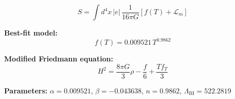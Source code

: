 
\begin{equation}
  S = \int d^4x \, |e| \, \frac{1}{16\pi G} \left[ f(T) + \mathcal{L}_m \right]
\end{equation}

\textbf{Best-fit model:}
\begin{equation}
  f(T) = 0.009521 \, T^{0.9862}
\end{equation}

\textbf{Modified Friedmann equation:}
\begin{equation}
  H^2 = \frac{8\pi G}{3} \rho - \frac{f}{6} + \frac{T f_T}{3}
\end{equation}

\textbf{Parameters:}
$\alpha = 0.009521$, \quad
$\beta = -0.043638$, \quad
$n = 0.9862$, \quad
$\Lambda_{\text{BI}} = 522.2819$